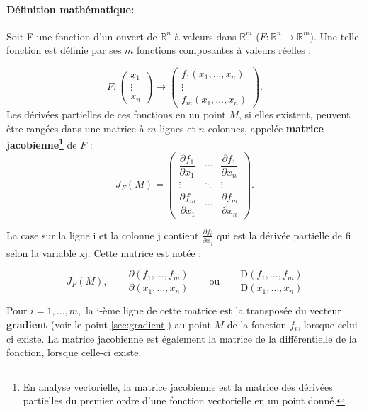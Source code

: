 	\paragraph*{Définition mathématique:}
	Soit F une fonction d'un ouvert de $\mathbb{R}^{n}$ à valeurs dans $\mathbb{R}^{m}$ ($F:\mathbb{R}^{n}\to \mathbb {R}^{m}$). Une telle fonction est définie par ses $m$ fonctions composantes à valeurs réelles :
	
	$$ 
	{ F:
		{\begin{pmatrix}
			x_{1}\\\vdots \\
			x_{n}
		\end{pmatrix}}
		\longmapsto 
		{\begin{pmatrix}
			f_{1}(x_{1},\dots ,x_{n})\\
			\vdots \\f_{m}(x_{1},\dots ,x_{n})
		\end{pmatrix}}}.
	$$
	Les dérivées partielles de ces fonctions en un point $M$, si elles existent, peuvent être rangées dans une matrice à $m$ lignes et $n$ colonnes, appelée \textbf{matrice jacobienne\footnote{En analyse vectorielle, la matrice jacobienne est la matrice des dérivées partielles du premier ordre d'une fonction vectorielle en un point donné.}} de $F$ :
	$$
	J_{F}\left(M\right)={
		\begin{pmatrix}
			{\dfrac {\partial f_{1}}{\partial x_{1}}}&\cdots &{\dfrac {\partial f_{1}}{\partial x_{n}}}\\
			\vdots &\ddots &\vdots \\
			{\dfrac {\partial f_{m}}{\partial x_{1}}}&\cdots &{\dfrac {\partial f_{m}}{\partial x_{n}}}
		\end{pmatrix}}.
	$$
	
	La case sur la ligne i et la colonne j contient ${\displaystyle {\frac {\partial f_{i}}{\partial x_{j}}}}$ qui est la dérivée partielle de fi selon la variable xj. Cette matrice est notée :
	
	$${\displaystyle J_{F}\left(M\right),\qquad {\frac {\partial \left(f_{1},\ldots ,f_{m}\right)}{\partial \left(x_{1},\ldots ,x_{n}\right)}}\qquad {\text{ou}}\qquad {\frac {\mathrm {D} \left(f_{1},\ldots ,f_{m}\right)}{\mathrm {D} \left(x_{1},\ldots ,x_{n}\right)}}}$$
	
	Pour $i = 1, … , m,$ la i-ème ligne de cette matrice est la transposée du vecteur \textbf{gradient} (voir le point \ref{sec:gradient}) au point $M$ de la fonction $f_i$, lorsque celui-ci existe. La matrice jacobienne est également la matrice de la différentielle de la fonction, lorsque celle-ci existe.
